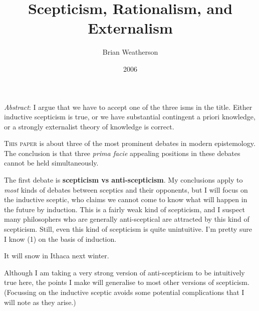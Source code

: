 \documentclass[
  11pt,
  letterpaper,
  DIV=11,
  numbers=noendperiod,
  twoside]{scrartcl}
\title{Scepticism, Rationalism, and Externalism}
\author{Brian Weatherson}
\date{2006}
\providecommand{\tightlist}{%
  \setlength{\itemsep}{0pt}\setlength{\parskip}{0pt}}
\renewenvironment{abstract}
 {\vspace{-1.25cm}
 \quotation\small\noindent\emph{Abstract}:}
 {\endquotation}
\renewenvironment{abstract}
 {\quotation\small\noindent\emph{Abstract}:}
 {\endquotation\vspace{-0.02cm}}
\begin{document}
\maketitle
\begin{abstract}
I argue that we have to accept one of the three isms in the title.
Either inductive scepticism is true, or we have substantial contingent a
priori knowledge, or a strongly externalist theory of knowledge is
correct.
\end{abstract}


\lettrine{T}{his paper} is about three of the most prominent debates in
modern epistemology. The conclusion is that three \emph{prima facie}
appealing positions in these debates cannot be held simultaneously.

The first debate is \textbf{scepticism vs anti-scepticism}. My
conclusions apply to \emph{most} kinds of debates between sceptics and
their opponents, but I will focus on the inductive sceptic, who claims
we cannot come to know what will happen in the future by induction. This
is a fairly weak kind of scepticism, and I suspect many philosophers who
are generally anti-sceptical are attracted by this kind of scepticism.
Still, even this kind of scepticism is quite unintuitive. I'm pretty
sure I know (1) on the basis of induction.

\begin{description}
\tightlist
\item[(1)]
It will snow in Ithaca next winter.
\end{description}

Although I am taking a very strong version of anti-scepticism to be
intuitively true here, the points I make will generalise to most other
versions of scepticism. (Focussing on the inductive sceptic avoids some
potential complications that I will note as they arise.)
\end{document}
